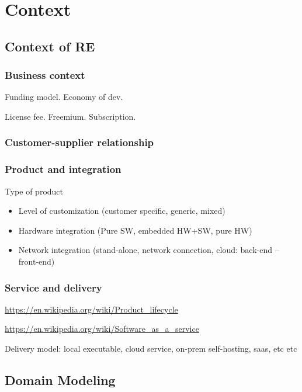 
\chapter{Context}%

\section{Context of RE}

\subsection{Business context}
Funding model. Economy of dev.

License fee. Freemium. Subscription.

\subsection{Customer-supplier relationship}

\subsection{Product and integration}

Type of product

\begin{itemize}
  \item Level of customization (customer specific, generic, mixed)
  \item Hardware integration (Pure SW, embedded HW+SW, pure HW)
  \item Network integration (stand-alone, network connection, cloud: back-end -- front-end)
\end{itemize}

\subsection{Service and delivery}

\url{https://en.wikipedia.org/wiki/Product_lifecycle}

\url{https://en.wikipedia.org/wiki/Software_as_a_service}

Delivery model: local executable, cloud service, on-prem self-hosting, saas, etc etc


\section{Domain Modeling}


